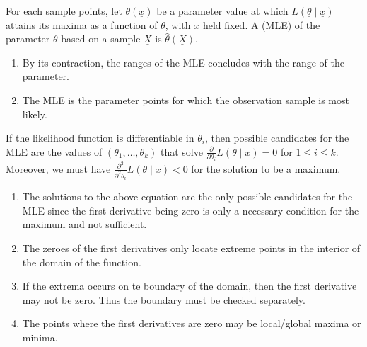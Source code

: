 \begin{definition}
    For each sample points, let $\overline{\theta}(\underline{x})$ be a parameter value at which $L(\underline{\theta} \mid \underline{x})$ attains its maxima as a function of $\underline{\theta}$, with $\underline{x}$ held fixed. A  (MLE) of the parameter $\theta$ based on a sample $\underline{X}$ is $\hat{\theta}(\underline{X})$.
\end{definition}

\begin{remark}
    \begin{enumerate}
        \item By its contraction, the ranges of the MLE concludes with the range of the parameter.
        \item The MLE is the parameter points for which the observation sample is most likely.
    \end{enumerate}
\end{remark}

If the likelihood function is differentiable in $\theta_{i}$, then possible candidates for the MLE are the values of $(\theta_{1},\ldots,\theta_{k})$ that solve $\frac{\partial}{\partial \theta_{i}}L(\underline{\theta} \mid \underline{x}) = 0$ for $1 \leq i \leq k$. Moreover, we must have $\frac{\partial^{2}}{\partial^{2}\theta_{i}}L(\underline{\theta} \mid \underline{x}) < 0$ for the solution to be a maximum.

\begin{remark}
    \begin{enumerate}
        \item The solutions to the above equation are the only possible candidates for the MLE since the first derivative being zero is only a necessary condition for the maximum and not sufficient.
        \item The zeroes of the first derivatives only locate extreme points in the interior of the domain of the function.
        \item If the extrema occurs on te boundary of the domain, then the first derivative may not be zero. Thus the boundary must be checked separately.
        \item The points where the first derivatives are zero may be local/global maxima or minima. 
    \end{enumerate}
\end{remark}


